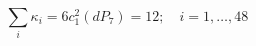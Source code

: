 \begin{equation}
\textstyle{\sum_{i}} \kappa_{i}  = 6 c^{2}_{1}(dP_{7}) = 12; \quad i =
1,\ldots,48
\end{equation}

